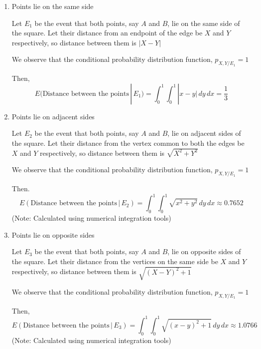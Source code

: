 \documentclass[12pt, oneside]{article}
\begin{document}
\begin{enumerate}
{    \begin{enumerate}
        \item {
            Points lie on the same side

            Let \(E_1\) be the event that both points, say \(A\) and \(B\), lie on
            the same side of the square. Let their distance from an endpoint of the edge
            be \(X\) and \(Y\) respectively, so distance between them is \(|X - Y|\)

            We observe that the conditional probability distribution function,
            \(p_{X, Y / E_1} = 1\) 

            Then, \[
                E(\text{Distance between the points} \,|\, E_1) = \int_{0}^{1} \int_{0}^{1}
                   |x - y| \,dy \,dx = \frac{1}{3}
            \]
        }

        \item {
            Points lie on adjacent sides

            Let \(E_2\) be the event that both points, say \(A\) and \(B\), lie on
            adjacent sides of the square. Let their distance from the vertex common to
            both the edges be \(X\) and \(Y\) respectively, so distance between them is
            \(\sqrt{X^2 + Y^2}\)

            We observe that the conditional probability distribution function,
            \(p_{X, Y / E_1} = 1\) 

            Then. \[
                E(\text{Distance between the points} \,|\, E_2) = \int_{0}^{1} \int_{0}^{1}
                \sqrt{x^2 + y^2} \,dy \,dx \approx 0.7652
            \]
            \hfill (Note: Calculated using numerical integration tools)
        }

        \item {
            Points lie on opposite sides

            Let \(E_3\) be the event that both points, say \(A\) and \(B\), lie on
            opposite sides of the square. Let their distance from the vertices on the
            same side be \(X\) and \(Y\) respectively, so distance between them is
            \(\sqrt{(X - Y)^2 + 1}\)

            We observe that the conditional probability distribution function,
            \(p_{X, Y / E_1} = 1\) 

            Then, \[
                E(\text{Distance between the points} \,|\, E_3) = \int_{0}^{1} \int_{0}^{1}
                   \sqrt{(x-y)^2 + 1} \,dy \,dx \approx 1.0766
            \]
            \hfill (Note: Calculated using numerical integration tools)
        }
    \end{enumerate}

}
\end{enumerate}
\end{document}
